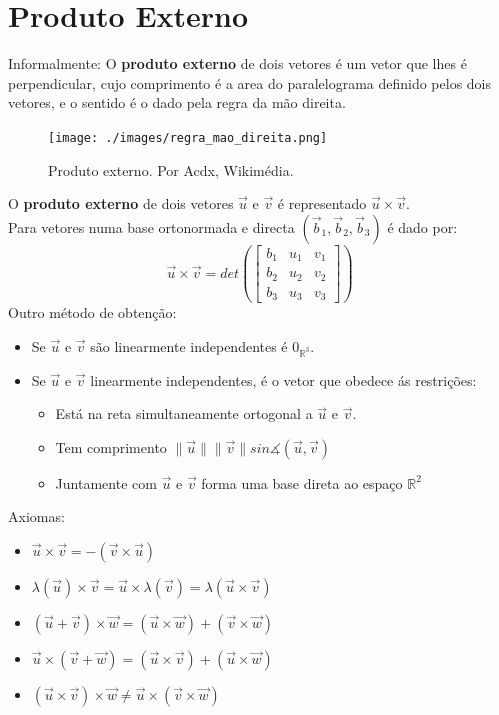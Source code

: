 \documentclass[]{report}
\begin{document}
\section{Produto Externo}
Informalmente: O \textbf{produto externo} de dois vetores é um vetor que lhes é perpendicular, cujo comprimento é a area do paralelograma definido pelos dois vetores, e o sentido é o dado pela regra da mão direita.
\vspace{2mm}
\begin{figure}
	\vspace{-5mm}
    \begin{center}
        \texttt{[image: ./images/regra\_mao\_direita.png]}
    \end{center}
	\vspace{-5mm}
    \caption{Produto externo. Por Acdx, Wikimédia.}
	\vspace{-10mm}
\end{figure}
O \textbf{produto externo} de dois vetores $\vec u$ e $\vec v$ é representado $\vec u \times \vec v$.\\
Para vetores numa base ortonormada e directa $(\vec b_1, \vec b_2, \vec b_3)$ é dado por:
$$\vec u \times \vec v = det\left(
\begin{bmatrix}
b_1 & u_1 & v_1\\
b_2 & u_2 & v_2\\
b_3 & u_3 & v_3
\end{bmatrix}
\right)$$
Outro método de obtenção:
\begin{itemize}
\item Se $\vec u$ e $\vec v$ são linearmente independentes é $0_{\mathbb{R}^3}$.
\item Se $\vec u$ e $\vec v$ linearmente independentes, é o vetor que obedece ás restrições:
\begin{itemize}
\item Está na reta simultaneamente ortogonal a $\vec u$ e $\vec v$.
\item Tem comprimento $\parallel \vec u \parallel \parallel \vec v \parallel sin \measuredangle(\vec u, \vec v)$
\item Juntamente com $\vec u$ e $\vec v$ forma uma base direta ao espaço $\mathbb{R}^2$
\end{itemize}
\end{itemize}
Axiomas:
\begin{itemize}
\item $\vec u \times \vec v = -(\vec v \times \vec u)$
\item $\lambda(\vec u) \times \vec v = \vec u \times \lambda(\vec v) = \lambda(\vec u \times \vec v)$
\item $(\vec u + \vec v) \times \vec w = (\vec u \times \vec w) + (\vec v \times \vec w)$
\item $\vec u \times (\vec v + \vec w) = (\vec u \times \vec v) + (\vec u \times \vec w)$
\item $(\vec u \times \vec v) \times \vec w \neq \vec u \times (\vec v \times \vec w)$
\end{itemize}
\clearpage
\end{document}
